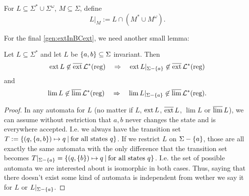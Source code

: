 \begin{mydef}
For $L \subseteq \Sigma^* \cup \Sigma^\omega$, $M \subseteq \Sigma$, define
\[ L|_M := L \cap (M^* \cup M^\omega) . \]
\end{mydef}

For the final \cref{gen:extInBCext}, we need another small lemma:

\begin{lemma}
\label{gen:multLetterInv}
Let $L \subseteq \Sigma^*$ and let $L$ be $\Set{a,b} \subseteq \Sigma$ invariant. Then
\[ \ext L \not\in \dext \Langreg \ \ \ \Rightarrow \ \ \ \ext L|_{\Sigma-\Set{a}} \not\in \dext \Langreg \]
and
\[ \lim L \not\in \dlim \Langreg \ \ \ \Rightarrow \ \ \ \lim L|_{\Sigma-\Set{a}} \not\in \dlim \Langreg . \]
\begin{proof}
In any automata for $L$ (no matter if $L$, $\operatorname{ext} L$, $\operatorname{\overline{ext}} L$, $\lim L$ or $\operatorname{\overline{lim}} L$), we can assume without restriction that $a,b$ never changes the state and is everywhere accepted. I.e. we always have the transition set $T := \Set{(q, \Set{a,b}) \mapsto q}{\text{for all states $q$}}$. If we restrict $L$ on $\Sigma-\Set{a}$, those are all exactly the same automata with the only difference that the transition set becomes $T|_{\Sigma-\Set{a}} = \Set{(q, \Set{b}) \mapsto q}{\text{for all states $q$}}$. I.e. the set of possible automata we are interested about is isomorphic in both cases. Thus, saying that there doesn't exist some kind of automata is independent from wether we say it for $L$ or $L|_{\Sigma-\Set{a}}$.
\end{proof}
\end{lemma}

